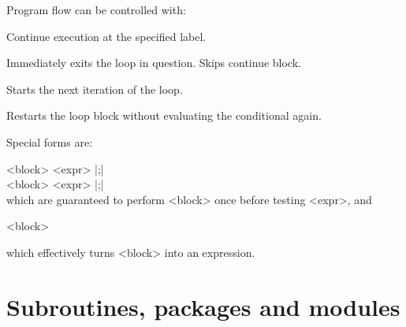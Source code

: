 \documentclass{refbase}
\begin{document}
Program flow can be controlled with:

\begin{enum}{1cm}

Continue execution at the specified label.

Immediately exits the loop in question. Skips continue block.

Starts the next iteration of the loop.

Restarts the loop block without evaluating the conditional again.

\end{enum}

Special forms are:

\quad	{} <block>  <expr> |;| \\
\quad	{} <block>  <expr> |;| \\

which are guaranteed to perform <block> once before testing <expr>, and

\quad	{} <block>

which effectively turns <block> into an expression.


\section{Subroutines, packages and modules} 
\end{document}
